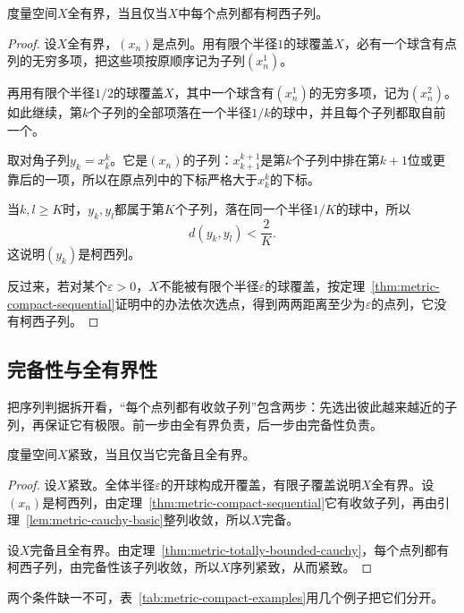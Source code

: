 \begin{theorem}[全有界的序列刻画]
\label{thm:metric-totally-bounded-cauchy}
度量空间$X$全有界，当且仅当$X$中每个点列都有柯西子列。
\end{theorem}

\begin{proof}
设$X$全有界，$(x_n)$是点列。用有限个半径$1$的球覆盖$X$，必有一个球含有点列的无穷多项，把这些项按原顺序记为子列$(x^{1}_n)$。

再用有限个半径$1/2$的球覆盖$X$，其中一个球含有$(x^{1}_n)$的无穷多项，记为$(x^{2}_n)$。如此继续，第$k$个子列的全部项落在一个半径$1/k$的球中，并且每个子列都取自前一个。

取对角子列$y_k=x^{k}_k$。它是$(x_n)$的子列：$x^{k+1}_{k+1}$是第$k$个子列中排在第$k+1$位或更靠后的一项，所以在原点列中的下标严格大于$x^{k}_k$的下标。

当$k,l\geq K$时，$y_k,y_l$都属于第$K$个子列，落在同一个半径$1/K$的球中，所以
\[
d(y_k,y_l)<\frac2K.
\]
这说明$(y_k)$是柯西列。

反过来，若对某个$\varepsilon>0$，$X$不能被有限个半径$\varepsilon$的球覆盖，按定理~\ref{thm:metric-compact-sequential}证明中的办法依次选点，得到两两距离至少为$\varepsilon$的点列，它没有柯西子列。
\end{proof}

\subsection{完备性与全有界性}
\label{sec:metric-complete-totally-bounded}

把序列判据拆开看，“每个点列都有收敛子列”包含两步：先选出彼此越来越近的子列，再保证它有极限。前一步由全有界负责，后一步由完备性负责。

\begin{theorem}[紧致的完备全有界判据]
\label{thm:metric-compact-complete-totally-bounded}
度量空间$X$紧致，当且仅当它完备且全有界。
\end{theorem}

\begin{proof}
设$X$紧致。全体半径$\varepsilon$的开球构成开覆盖，有限子覆盖说明$X$全有界。设$(x_n)$是柯西列，由定理~\ref{thm:metric-compact-sequential}它有收敛子列，再由引理~\ref{lem:metric-cauchy-basic}整列收敛，所以$X$完备。

设$X$完备且全有界。由定理~\ref{thm:metric-totally-bounded-cauchy}，每个点列都有柯西子列，由完备性该子列收敛，所以$X$序列紧致，从而紧致。
\end{proof}

两个条件缺一不可，表~\ref{tab:metric-compact-examples}用几个例子把它们分开。

